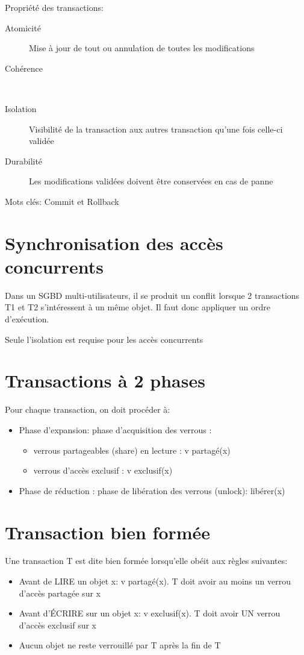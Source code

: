 \documentclass[12pt,a4paper,openany]{book}
\begin{document}
Propriété des transactions:
\begin{description}
	\item[Atomicité] Mise à jour de tout ou annulation de toutes les modifications 
	\item[Cohérence]~
	\item[Isolation] Visibilité de la transaction aux autres transaction qu'une fois celle-ci validée
	\item[Durabilité] Les modifications validées doivent être conservées en cas de panne   
\end{description}

Mots clés: Commit et Rollback 

\section{Synchronisation des accès concurrents}
Dans un SGBD multi-utilisateurs, il se produit un conflit lorsque 2 transactions T1 et T2 s'intéressent à un même objet. Il faut donc appliquer un ordre d'exécution.  

\begin{remarque}
	Seule l'isolation est requise pour les accès concurrents 
\end{remarque}

\section{Transactions à 2 phases}
Pour chaque transaction, on doit procéder à: 
\begin{itemize}
	\item Phase d'expansion: phase d'acquisition des verrous :  
\begin{itemize}
	\item verrous partageables (share) en lecture : v partagé(x) 
	\item verrous d'accès exclusif : v exclusif(x) 
\end{itemize}
\item Phase de réduction : phase de libération des verrous (unlock): libérer(x)
\end{itemize}

\section{Transaction bien formée}
Une transaction T est dite bien formée lorsqu'elle obéit aux règles suivantes: 
\begin{itemize}
	\item Avant de LIRE un objet x: v partagé(x). T doit avoir au moins un verrou d'accès partagée sur x 
	\item Avant d'ÉCRIRE sur un objet x: v exclusif(x). T doit avoir UN verrou d'accès exclusif sur x 
	\item Aucun objet ne reste verrouillé par T après la fin de T 
\end{itemize}
\end{document}
